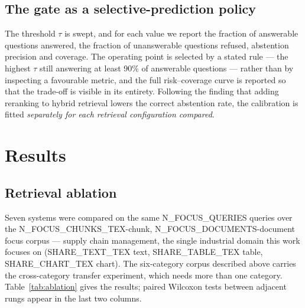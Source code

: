 \documentclass[preprint,3p,times]{elsarticle}
\begin{document}
\subsection{The gate as a selective-prediction policy}

The threshold $\tau$ is swept, and for each value we report the fraction of
answerable questions answered, the fraction of unanswerable questions refused,
abstention precision and coverage. The operating point is selected by a stated
rule --- the highest $\tau$ still answering at least 90\% of answerable
questions --- rather than by inspecting a favourable metric, and the full
risk--coverage curve is reported so that the trade-off is visible in its
entirety. Following the finding that adding reranking to hybrid retrieval
lowers the correct abstention rate, the calibration is fitted \emph{separately
for each retrieval configuration compared}.

\section{Results}
\label{sec:results}

\subsection{Retrieval ablation}

Seven systems were compared on the same {{N_FOCUS_QUERIES}} queries over the
{{N_FOCUS_CHUNKS_TEX}}-chunk, {{N_FOCUS_DOCUMENTS}}-document focus corpus ---
supply chain management, the single industrial domain this work focuses on
({{SHARE_TEXT_TEX}} text, {{SHARE_TABLE_TEX}} table, {{SHARE_CHART_TEX}} chart).
The six-category corpus described above carries the cross-category transfer
experiment, which needs more than one category.
Table~\ref{tab:ablation} gives the results; paired Wilcoxon tests between
adjacent rungs appear in the last two columns.
\end{document}
